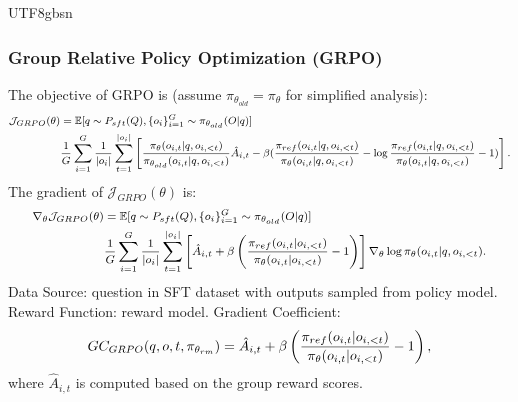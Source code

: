 \documentclass[11pt, a4paper, logo, copyright, nonumbering]{deepseek}
\begin{document}
\begin{CJK*}{UTF8}{gbsn}
\subsubsection{Group Relative Policy Optimization (GRPO)}
The objective of GRPO is (assume $\pi_{\theta_{old}} = \pi_{\theta}$ for simplified analysis):
\begin{equation}
\footnotesize
\begin{split}
    \mathcal{J}_{GRPO}(\theta) &= \mathbb{E}{[q \sim P_{sft}(Q), \{o_i\}_{i=1}^G \sim \pi_{\theta_{old}}(O|q)]}  \\
    & \frac{1}{G}\sum_{i=1}^G\frac{1}{|o_i|} \sum_{t=1}^{|o_i|} \left[\frac{\pi_\theta(o_{i,t} | q, o_{i,<t})}{\pi_{\theta_{old}}(o_{i,t} | q, o_{i,<t})} \hat{A}_{i,t} - \beta (\frac{\pi_{ref}(o_{i,t}|q,o_{i,<t})}{\pi_{\theta}(o_{i,t}|q,o_{i,<t})}- \log\frac{\pi_{ref}(o_{i,t}|q,o_{i,<t})}{\pi_{\theta}(o_{i,t}|q,o_{i,<t})} - 1)\right].
\end{split}
\end{equation}
The gradient of $\mathcal{J}_{GRPO}(\theta)$ is:
\begin{equation}
\footnotesize
\begin{split}
    \nabla_{\theta}\mathcal{J}_{GRPO}(\theta)  & = \mathbb{E}{[q \sim P_{sft}(Q), \{o_i\}_{i=1}^G \sim \pi_{\theta_{old}}(O|q)]} \\
    & \frac{1}{G}\sum_{i=1}^G\frac{1}{|o_i|} \sum_{t=1}^{|o_i|}  
    \left[\hat{A}_{i,t} + \beta \left(\frac{\pi_{ref}(o_{i,t}|o_{i,<t})}{\pi_{\theta}(o_{i,t}|o_{i,<t})} - 1\right)\right]  \nabla_{\theta}\log \pi_\theta(o_{i,t} | q, o_{i,<t}). 
\end{split}
\end{equation}
Data Source:  question in SFT dataset with outputs sampled from policy model.
Reward Function: reward model.
Gradient Coefficient:
\begin{equation}
\footnotesize
    GC_{GRPO}(q, o, t, \pi_{\theta_{rm}}) = \hat{A}_{i,t} + \beta \left(\frac{\pi_{ref}(o_{i,t}|o_{i,<t})}{\pi_{\theta}(o_{i,t}|o_{i,<t})} - 1\right),
\label{eq:GC-GRPO}
\end{equation}
where $\hat{A}_{i,t}$ is computed based on the group reward scores.

\end{CJK*}
\end{document}
